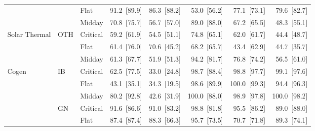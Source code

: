 \begin{tabular}{l l l r r r r r}
 &  & Flat & 91.2~{\color{seasoncol}\scriptsize[89.9]} & 86.3~{\color{seasoncol}\scriptsize[88.2]} & 53.0~{\color{seasoncol}\scriptsize[56.2]} & 77.1~{\color{seasoncol}\scriptsize[73.1]} & 79.6~{\color{seasoncol}\scriptsize[82.7]} \\
 &  & Midday & 70.8~{\color{seasoncol}\scriptsize[75.7]} & 56.7~{\color{seasoncol}\scriptsize[57.0]} & 89.0~{\color{seasoncol}\scriptsize[88.0]} & 67.2~{\color{seasoncol}\scriptsize[65.5]} & 48.3~{\color{seasoncol}\scriptsize[55.1]} \\
\addlinespace
Solar Thermal & OTH & Critical & 59.2~{\color{seasoncol}\scriptsize[61.9]} & 54.5~{\color{seasoncol}\scriptsize[51.1]} & 74.8~{\color{seasoncol}\scriptsize[65.1]} & 62.0~{\color{seasoncol}\scriptsize[61.7]} & 44.4~{\color{seasoncol}\scriptsize[48.7]} \\
 &  & Flat & 61.4~{\color{seasoncol}\scriptsize[76.0]} & 70.6~{\color{seasoncol}\scriptsize[45.2]} & 68.2~{\color{seasoncol}\scriptsize[65.7]} & 43.4~{\color{seasoncol}\scriptsize[62.9]} & 44.7~{\color{seasoncol}\scriptsize[35.7]} \\
 &  & Midday & 61.3~{\color{seasoncol}\scriptsize[67.7]} & 51.9~{\color{seasoncol}\scriptsize[51.3]} & 94.2~{\color{seasoncol}\scriptsize[81.7]} & 76.8~{\color{seasoncol}\scriptsize[74.2]} & 56.5~{\color{seasoncol}\scriptsize[61.0]} \\
\addlinespace
Cogen & IB & Critical & 62.5~{\color{seasoncol}\scriptsize[77.5]} & 33.0~{\color{seasoncol}\scriptsize[24.8]} & 98.7~{\color{seasoncol}\scriptsize[88.4]} & 98.8~{\color{seasoncol}\scriptsize[97.7]} & 99.1~{\color{seasoncol}\scriptsize[97.6]} \\
 &  & Flat & 43.1~{\color{seasoncol}\scriptsize[35.1]} & 34.3~{\color{seasoncol}\scriptsize[19.5]} & 98.6~{\color{seasoncol}\scriptsize[89.9]} & 100.0~{\color{seasoncol}\scriptsize[99.3]} & 94.4~{\color{seasoncol}\scriptsize[96.3]} \\
 &  & Midday & 80.2~{\color{seasoncol}\scriptsize[92.8]} & 42.6~{\color{seasoncol}\scriptsize[31.9]} & 100.0~{\color{seasoncol}\scriptsize[88.0]} & 98.9~{\color{seasoncol}\scriptsize[97.8]} & 100.0~{\color{seasoncol}\scriptsize[98.2]} \\
 & GN & Critical & 91.6~{\color{seasoncol}\scriptsize[86.6]} & 91.0~{\color{seasoncol}\scriptsize[83.2]} & 98.8~{\color{seasoncol}\scriptsize[81.8]} & 95.5~{\color{seasoncol}\scriptsize[86.2]} & 89.0~{\color{seasoncol}\scriptsize[88.0]} \\
 &  & Flat & 87.4~{\color{seasoncol}\scriptsize[87.4]} & 88.3~{\color{seasoncol}\scriptsize[66.3]} & 95.7~{\color{seasoncol}\scriptsize[73.5]} & 70.7~{\color{seasoncol}\scriptsize[71.8]} & 89.3~{\color{seasoncol}\scriptsize[74.1]} \\

\end{tabular}
